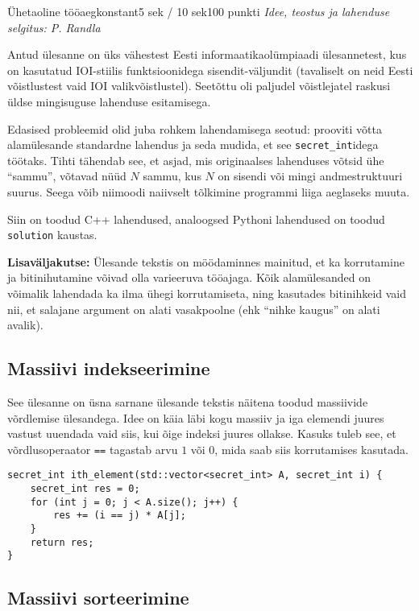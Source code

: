 \begin{yl}{7}{Ühetaoline tööaeg}{konstant}{5 sek / 10 sek}{100 punkti}
  \emph{Idee, teostus ja lahenduse selgitus: P. Randla}

  Antud ülesanne on üks vähestest Eesti informaatikaolümpiaadi ülesannetest, kus on kasutatud IOI-stiilis funktsioonidega sisendit-väljundit (tavaliselt on neid Eesti võistlustest vaid IOI valikvõistlustel). Seetõttu oli paljudel võistlejatel raskusi üldse mingisuguse lahenduse esitamisega.

  Edasised probleemid olid juba rohkem lahendamisega seotud: prooviti võtta alamülesande standardne lahendus ja seda mudida, et see \verb'secret_int'idega töötaks. Tihti tähendab see, et asjad, mis originaalses lahenduses võtsid ühe ``sammu'', võtavad nüüd $N$ sammu, kus $N$ on sisendi või mingi andmestruktuuri suurus. Seega võib niimoodi naiivselt tõlkimine programmi liiga aeglaseks muuta.

  Siin on toodud C++ lahendused, analoogsed Pythoni lahendused on toodud \verb'solution' kaustas.

  \textbf{Lisaväljakutse:} Ülesande tekstis on möödaminnes mainitud, et ka korrutamine ja biti\-nihu\-ta\-mine võivad olla varieeruva tööajaga. Kõik alamülesanded on võimalik lahendada ka ilma ühegi korrutamiseta, ning kasutades bitinihkeid vaid nii, et salajane argument on alati vasakpoolne (ehk ``nihke kaugus'' on alati avalik).

  \subsection*{Massiivi indekseerimine}

  See ülesanne on üsna sarnane ülesande tekstis näitena toodud massiivide võrdlemise ülesandega. Idee on käia läbi kogu massiiv ja iga elemendi juures vastust uuendada vaid siis, kui õige indeksi juures ollakse. Kasuks tuleb see, et võrdlusoperaator \verb'==' tagastab arvu $1$ või $0$, mida saab siis korrutamises kasutada.

  \begin{lstlisting}
secret_int ith_element(std::vector<secret_int> A, secret_int i) {
    secret_int res = 0;
    for (int j = 0; j < A.size(); j++) {
        res += (i == j) * A[j];
    }
    return res;
}
  \end{lstlisting}

  \subsection*{Massiivi sorteerimine}


\end{yl}
